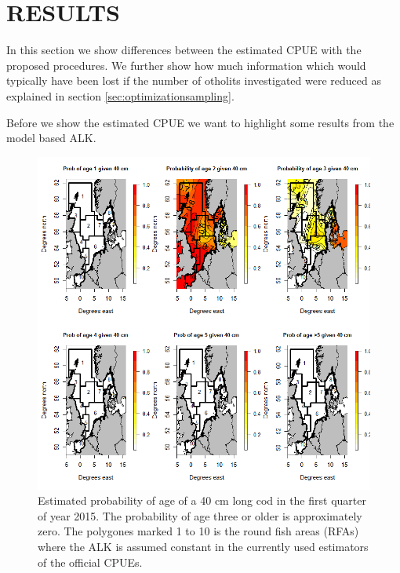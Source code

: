\documentclass[a4paper 12pt]{article}
\numberwithin{equation}{section}
\begin{document}
\section{RESULTS}
In this section we show differences between the estimated CPUE with the proposed procedures. We further show how much information which would typically have been lost if the number of otholits investigated were reduced as explained in section \ref{sec:optimizationsampling}.

Before we show the estimated CPUE we want to highlight some results from the model based ALK. 
\label{sec:results}
\begin{figure}[h!]
\centering
\includegraphics[scale=0.4]{Allcode40cm2015.png}
\caption{Estimated probability of age of a 40 cm long cod in the first quarter of year 2015. The probability of age three or older is approximately zero. The polygones marked 1 to 10 is the round fish areas (RFAs) where the ALK is assumed constant in the currently used estimators of the official CPUEs.}\label{fig:40cmCod2015}
\end{figure}
\end{document}
